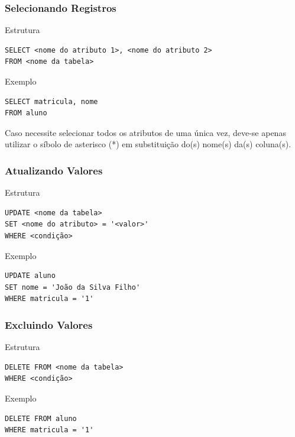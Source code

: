 \documentclass{beamer}
\begin{document}
\begin{frame}[fragile]
\frametitle{Selecionando Registros}

\begin{block}{Estrutura}
\begin{lstlisting}
SELECT <nome do atributo 1>, <nome do atributo 2>
FROM <nome da tabela>
\end{lstlisting}
\end{block}\vfill

\begin{exampleblock}{Exemplo}
\begin{lstlisting}
SELECT matricula, nome
FROM aluno
\end{lstlisting}
\end{exampleblock}\vfill

\alert{Caso necessite selecionar todos os atributos de uma única vez, deve-se
	apenas utilizar o síbolo de asterisco (*) em substituição do(s) nome(s)
	da(s) coluna(s).}
\end{frame}

\begin{frame}[fragile]
\frametitle{Atualizando Valores}

\begin{block}{Estrutura}
\begin{lstlisting}
UPDATE <nome da tabela>
SET <nome do atributo> = '<valor>'
WHERE <condição>
\end{lstlisting}
\end{block}\vfill

\begin{exampleblock}{Exemplo}
\begin{lstlisting}
UPDATE aluno
SET nome = 'João da Silva Filho'
WHERE matricula = '1'
\end{lstlisting}
\end{exampleblock}
\end{frame}

\begin{frame}[fragile]
\frametitle{Excluindo  Valores}

\begin{block}{Estrutura}
\begin{lstlisting}
DELETE FROM <nome da tabela>
WHERE <condição>
\end{lstlisting}
\end{block}\vfill

\begin{exampleblock}{Exemplo}
\begin{lstlisting}
DELETE FROM aluno
WHERE matricula = '1'
\end{lstlisting}
\end{exampleblock}
\end{frame}
\end{document}
